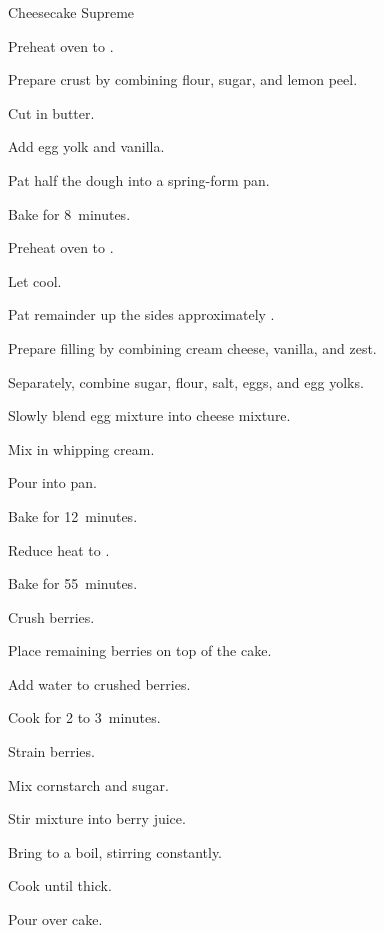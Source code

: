 \begin{recipe}{Cheesecake Supreme}{}{}
\begin{directions}
\item Preheat oven to .
\item Prepare crust by combining flour, sugar, and lemon peel.
\item Cut in butter.
\item Add egg yolk and vanilla.
\item Pat half the dough into a spring-form pan.
\item Bake for 8~minutes.
\item Preheat oven to .
\item Let cool.
\item Pat remainder up the sides approximately \inch{1\half}.
\item Prepare filling by combining cream cheese, vanilla, and zest.
\item Separately, combine sugar, flour, salt, eggs, and egg yolks.
\item Slowly blend egg mixture into cheese mixture.
\item Mix in whipping cream.
\item Pour into pan.
\item Bake for 12~minutes.
\item Reduce heat to .
\item Bake for 55~minutes.
\item Crush  berries.
\item Place remaining berries on top of the cake.
\item Add water to crushed berries.
\item Cook for 2 to 3~minutes.
\item Strain berries.
\item Mix cornstarch and sugar.
\item Stir mixture into berry juice.
\item Bring to a boil, stirring constantly.
\item Cook until thick.
\item Pour over cake.
\end{directions}

\end{recipe}
